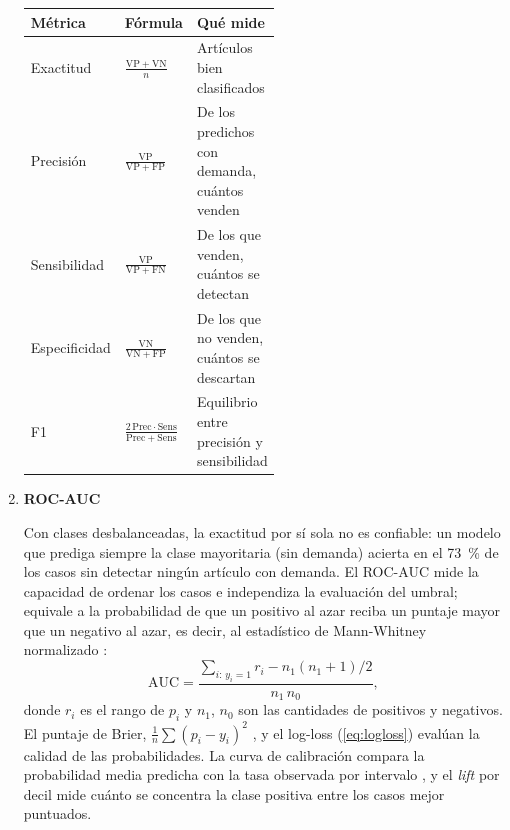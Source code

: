 \documentclass[
  journal=largetwo,
  manuscript=Laboratorio-Numero-02,
  year=2026,
  volume=1
]{cup-journal}
\begin{document}
\begin{enumerate}
\par\medskip\noindent\begin{minipage}{\linewidth}
\label{tab:metricas-def}
\centering
\small
\renewcommand{\arraystretch}{1.6}
\begin{tabularx}{\linewidth}{>{\raggedright\arraybackslash}p{0.22\linewidth}>{\centering\arraybackslash}p{0.3\linewidth}>{\raggedright\arraybackslash}X}
\toprule
\textbf{Métrica} & \textbf{Fórmula} & \textbf{Qué mide} \\
\midrule
Exactitud & $\frac{\mathrm{VP}+\mathrm{VN}}{n}$ & Artículos bien clasificados \\
Precisión & $\frac{\mathrm{VP}}{\mathrm{VP}+\mathrm{FP}}$ & De los predichos con demanda, cuántos venden \\
Sensibilidad & $\frac{\mathrm{VP}}{\mathrm{VP}+\mathrm{FN}}$ & De los que venden, cuántos se detectan \\
Especificidad & $\frac{\mathrm{VN}}{\mathrm{VN}+\mathrm{FP}}$ & De los que no venden, cuántos se descartan \\
F1 & $\frac{2\,\mathrm{Prec}\cdot\mathrm{Sens}}{\mathrm{Prec}+\mathrm{Sens}}$ & Equilibrio entre precisión y sensibilidad \\
\bottomrule
\end{tabularx}
\end{minipage}\par\medskip

  \item \textbf{ROC-AUC}

Con clases desbalanceadas, la exactitud por sí sola no es confiable: un modelo que prediga siempre la clase mayoritaria (sin demanda) acierta en el 73~\% de los casos sin detectar ningún artículo con demanda. El ROC-AUC mide la capacidad de ordenar los casos e independiza la evaluación del umbral; equivale a la probabilidad de que un positivo al azar reciba un puntaje mayor que un negativo al azar, es decir, al estadístico de Mann-Whitney normalizado \autocite{hanley1982auc,fawcett2006roc}:
\begin{equation}
\mathrm{AUC}=\frac{\sum_{i:\,y_i=1}r_i-n_1(n_1+1)/2}{n_1\,n_0},
\label{eq:auc}
\end{equation}
donde $r_i$ es el rango de $p_i$ y $n_1$, $n_0$ son las cantidades de positivos y negativos. El puntaje de Brier, $\frac1n\sum(p_i-y_i)^2$ \autocite{brier1950}, y el log-loss (\ref{eq:logloss}) evalúan la calidad de las probabilidades. La curva de calibración compara la probabilidad media predicha con la tasa observada por intervalo \autocite{niculescu2005calibration}, y el \textit{lift} por decil mide cuánto se concentra la clase positiva entre los casos mejor puntuados.

\end{enumerate}
\end{document}
